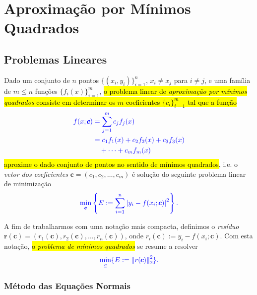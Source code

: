 
\chapter{Aproximação por Mínimos Quadrados}\label{cap_ajuste}

\section{Problemas Lineares}\label{cap_ajuste_sec_prob_lin}

Dado um conjunto de $n$ pontos $\{(x_i,y_i)\}_{i=1}^n$, $x_i\neq x_j$ para $i\neq j$, e uma família de $m \leq n$ funções $\{f_i(x)\}_{i=1}^m$, \hl{o problema linear de \emph{aproximação por mínimos quadrados} consiste em determinar os $m$ coeficientes $\{c_i\}_{i=1}^m$ tal que a função}
\begin{subequations}\hleq
  \begin{align}    
    f(x; \pmb{c}) &= \sum_{j=1}^m c_jf_j(x) \\
    &= c_1f_1(x) + c_2f_2(x) + c_3f_3(x) \nonumber\\
    &\quad + \cdots + c_mf_m(x)
  \end{align}
\end{subequations}
\hl{aproxime o dado conjunto de pontos no sentido de mínimos quadrados}, i.e. o \emph{vetor dos coeficientes} $\pmb{c} = (c_1, c_2, \dotsc, c_m)$ é solução do seguinte problema linear de minimização
\begin{equation}\color{blue}\min_{\pmb{c}} \left\{E:= \sum_{i=1}^n \left|y_i - f(x_i; \pmb{c})\right|^2\right\}.
\end{equation}

A fim de trabalharmos com uma notação mais compacta, definimos o \emph{resíduo} $\pmb{r}(\pmb{c}) = (r_1(\pmb{c}), r_2(\pmb{c}), \dotsc, r_n(\pmb{c}))$, onde $r_i(\pmb{c}) := y_i - f(x_i; \pmb{c})$. Com esta notação, \hl{o \emph{problema de mínimos quadrados}} se resume a resolver
\begin{equation}\label{cap_ajuste_sec_prob_lin:eq:pmq}\color{blue}\min_{\emph{c}} \{E := \left\|r(\pmb{c})\right\|_2^2\}.
\end{equation}

\subsection{Método das Equações Normais}

